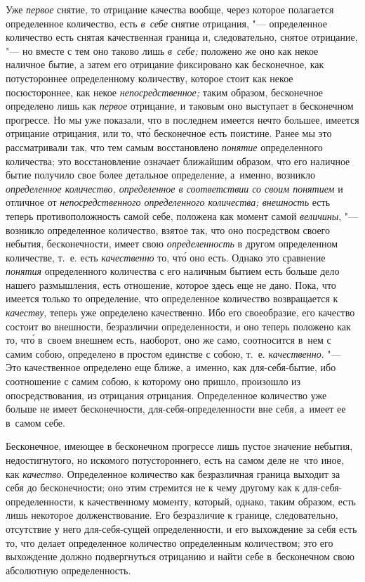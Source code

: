 Уже {\em первое} снятие, то отрицание качества вообще, через которое полагается
определенное количество, есть {\em в~себе} снятие отрицания, "--- определенное
количество есть снятая качественная граница и, следовательно, снятое отрицание,
"--- но вместе с тем оно таково лишь {\em в~себе;} положено же оно как некое
наличное бытие, а затем его отрицание фиксировано как бесконечное, как
потустороннее определенному количеству, которое стоит как некое посюстороннее,
как некое {\em непосредственное;} таким образом, бесконечное определено лишь
как {\em первое} отрицание, и таковым оно выступает в бесконечном прогрессе.
Но мы уже показали, что в последнем имеется нечто большее, имеется отрицание
отрицания, или то, чт\'{о} бесконечное есть поистине. Ранее мы это
рассматривали так, что тем самым восстановлено {\em понятие} определенного
количества; это восстановление означает ближайшим образом, что его наличное
бытие получило свое более детальное определение, а~именно, возникло
{\em определенное количество, определенное в соответствии со своим понятием}
и отличное от {\em непосредственного определенного количества; внешность} есть
теперь противоположность самой себе, положена как момент самой {\em величины},
"--- возникло определенное количество, взятое так, что оно посредством своего
небытия, бесконечности, имеет свою {\em определенность} в другом определенном
количестве, т.~е. есть {\em качественно} то, чт\'{о} оно есть. Однако это
сравнение {\em понятия} определенного количества с его наличным бытием есть
больше дело нашего размышления, есть отношение, которое здесь еще не дано.
Пока, что имеется только то определение, что определенное количество
возвращается к {\em качеству}, теперь уже определено качественно. Ибо его
своеобразие, его качество состоит во внешности, безразличии определенности,
и оно теперь положено как то, чт\'{о} в~своем внешнем есть, наоборот, оно же
само, соотносится в~нем с самим собою, определено в простом единстве с собою,
т.~е. {\em качественно}. "--- Это качественное определено еще ближе, а~именно,
как для-себя-бытие, ибо соотношение с самим собою, к которому оно пришло,
произошло из опосредствования, из отрицания отрицания. Определенное количество
уже больше не имеет бесконечности, для-себя-определенности вне себя,
а~имеет ее в~самом себе.

Бесконечное, имеющее в бесконечном прогрессе лишь пустое значение небытия,
недостигнутого, но искомого потустороннего, есть на самом деле не~что иное,
как {\em качество}. Определенное количество как безразличная граница выходит
за себя до бесконечности; оно этим стремится не к чему другому как
к для-себя-определенности, к качественному моменту, который, однако, таким
образом, есть лишь некоторое долженствование. Его безразличие к границе,
следовательно, отсутствие у него для-себя-сущей определенности, и его
выхождение за себя есть то, что делает определенное количество определенным
количеством; это его выхождение должно подвергнуться отрицанию и найти
себе в~бесконечном свою абсолютную определенность.

